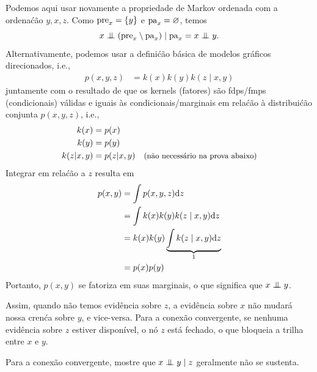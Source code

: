 \begin{exenumerate}
    \begin{solution}
        Podemos aqui usar novamente a propriedade de Markov ordenada com a
        ordena\'c\~ao $y, x, z$. Como $\mathrm{pre}_x = \{y\}$ e $\mathrm{pa}_x =
        \varnothing$, temos
        \begin{equation}
            x \mathrel{\perp\mspace{-10mu}\perp} ( \mathrm{pre}_x \setminus \mathrm{pa}_x ) \mid \mathrm{pa}_x = x \mathrel{\perp\mspace{-10mu}\perp} y.
        \end{equation}
        Alternativamente, podemos usar a defini\'c\~ao b\'asica de modelos
        gr\'aficos direcionados, i.e.,
        \begin{align}
            p(x,y,z) & = k(x) k(y) k(z \mid x, y)
        \end{align}
        juntamente com o resultado de que os kernels (fatores) s\~ao fdps/fmps
        (condicionais) v\'alidas e iguais \`as condicionais/marginais
        em rela\'c\~ao \`a distribui\'c\~ao conjunta $p(x,y,z)$, i.e.,
        \begin{align}
            k(x) & = p(x)\\
            k(y) &= p(y) \\
            k(z | x, y) & = p(z|x,y) \quad \text{\small (n\~ao necess\'ario na prova abaixo)}
        \end{align}
        Integrar em rela\'c\~ao a $z$ resulta em
        \begin{align}
            p(x,y) & = \int p(x,y,z) \mathrm{d} z\\
            & =  \int  k(x) k(y) k(z \mid x, y) \mathrm{d} z\\
            & = k(x) k(y) \underbrace{\int k(z \mid x, y) \mathrm{d} z}_{1}\\
            & = p(x) p(y)
        \end{align}
        Portanto, $p(x,y)$ se fatoriza em suas marginais, o que significa que $x
        \mathrel{\perp\mspace{-10mu}\perp} y$.
        
        Assim, quando n\~ao temos evid\^encia sobre $z$, a evid\^encia sobre $x$
        n\~ao mudar\'a nossa cren\'ca sobre $y$, e vice-versa. Para a
        conex\~ao convergente, se nenhuma evid\^encia sobre $z$ estiver dispon\'ivel, o
        n\'o $z$ est\'a fechado, o que bloqueia a trilha entre $x$ e $y$.
        
    \end{solution}
    
    \item Para a conex\~ao convergente, mostre que $x \mathrel{\perp\mspace{-10mu}\perp} y \mid
    z$ geralmente n\~ao se sustenta.
    

\end{exenumerate}
